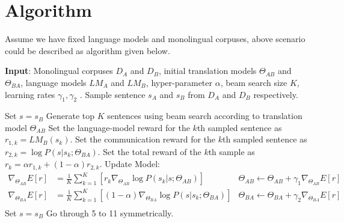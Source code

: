 \documentclass[11pt]{article}
\begin{document}
{\part{Algorithm}
Assume we have fixed language models and monolingual corpuses, above scenario could be described as algorithm given below.
\begin{algorithm}
\begin{algorithmic}[1]
\State \textbf{Input}: Monolingual corpuses $D_A$ and $D_B$, initial translation models $\Theta_{AB}$ and $\Theta_{BA}$, language models $LM_A$ and $LM_B$, hyper-parameter $\alpha$, beam search size $K$, learning rates $\gamma_1,\gamma_2$ .
\Repeat
\State Sample sentence $s_A$ and $s_B$ from $D_A$ and $ D_B$ respectively.

\State Set $s = s_B$
\State Generate top $K$ sentences using beam search according to translation model $\Theta_{AB}$
\State Set the language-model reward for the $k$th sampled sentence as $r_{1,k}=LM_B(s_{k})$.
\State Set the communication reward for the $k$th sampled sentence as $r_{2,k}=\log P(s|s_{k};\Theta_{BA})$.
\State Set the total reward of the $k$th sample as $r_k = \alpha r_{1,k} + (1-\alpha)r_{2,k}$.
\EndFor
\State Update Model:
\begin{align*}
\nabla_{\Theta_{AB}} E[r] &= \frac{1}{K}\sum^K_{k=1}[r_k\nabla_{\Theta_{AB}}\log P(s_{k}|s; \Theta_{AB})]&\Theta_{AB} \leftarrow\Theta_{AB} + \gamma_1\nabla_{\Theta_{AB}} E[r]\\
\nabla_{\Theta_{BA}} E[r] &= \frac{1}{K}\sum^K_{k=1} [(1-\alpha)\nabla_{\Theta_{BA}} \log P(s|s_{k};\Theta_{BA})]&\Theta_{BA} \leftarrow\Theta_{BA} + \gamma_2\nabla_{\Theta_{BA}} E[r]\\
\end{align*}
\State Set $s = s_B$
\State Go through 5 to 11 symmetrically.
\end{algorithmic}
\end{algorithm}
}
\end{document}
